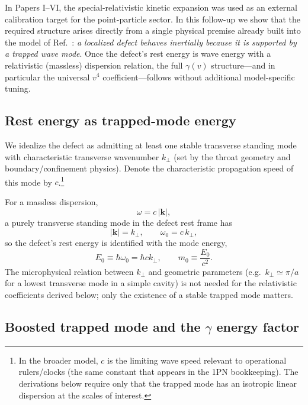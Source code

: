 \documentclass[11pt]{article}
\begin{document}
In Papers I--VI, the special-relativistic kinetic expansion was used as an external calibration target for the point-particle sector. In this follow-up we show that the required structure arises directly from a single physical premise already built into the model of Ref.~\cite{norris2026_4d_model}: \emph{a localized defect behaves inertially because it is supported by a trapped wave mode}. Once the defect's rest energy is wave energy with a relativistic (massless) dispersion relation, the full $\gamma(v)$ structure---and in particular the universal $v^4$ coefficient---follows without additional model-specific tuning.

\subsection{Rest energy as trapped-mode energy}

We idealize the defect as admitting at least one stable transverse standing mode with characteristic transverse wavenumber $k_\perp$ (set by the throat geometry and boundary/confinement physics). Denote the characteristic propagation speed of this mode by $c$.\footnote{In the broader model, $c$ is the limiting wave speed relevant to operational rulers/clocks (the same constant that appears in the 1PN bookkeeping). The derivations below require only that the trapped mode has an isotropic linear dispersion at the scales of interest.}

For a massless dispersion,
\begin{equation}
\omega = c\,|\mathbf k| ,
\end{equation}
a purely transverse standing mode in the defect rest frame has
\begin{equation}
|\mathbf k| = k_\perp, \qquad \omega_0 = c\,k_\perp,
\end{equation}
so the defect's rest energy is identified with the mode energy,
\begin{equation}
E_0 \equiv \hbar \omega_0 = \hbar c k_\perp,
\qquad
m_0 \equiv \frac{E_0}{c^2}.
\label{eq:E0_m0_def}
\end{equation}
The microphysical relation between $k_\perp$ and geometric parameters (e.g.\ $k_\perp\simeq \pi/a$ for a lowest transverse mode in a simple cavity) is not needed for the relativistic coefficients derived below; only the existence of a stable trapped mode matters.

\subsection{Boosted trapped mode and the $\gamma$ energy factor}
\end{document}
